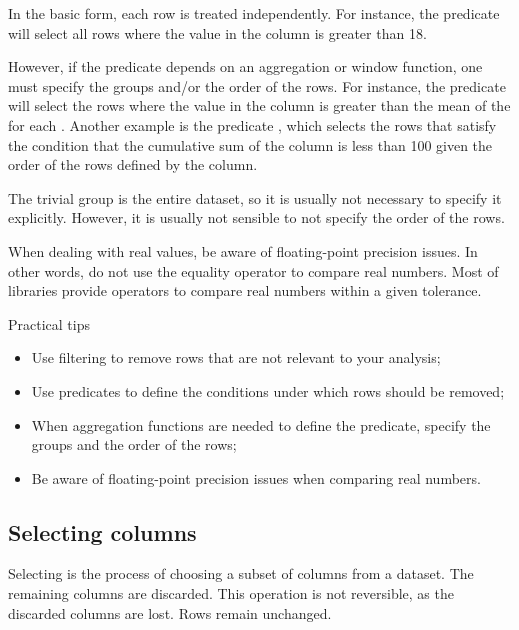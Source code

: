 In the basic form, each row is treated independently.  For instance, the predicate
 will select all rows where the value in the  column is
greater than 18.

However, if the predicate depends on an aggregation or window function, one must specify
the groups and/or the order of the rows.  For instance, the predicate  will select the rows where the value in the 
column is greater than the mean of the  for each . Another
example is the predicate , which selects the rows
that satisfy the condition that the cumulative sum of the  column is less
than 100 given the order of the rows defined by the  column.

The trivial group is the entire dataset, so it is usually not necessary to specify it
explicitly.  However, it is usually not sensible to not specify the order of the rows.

When dealing with real values, be aware of floating-point precision issues.  In other
words, do not use the equality operator to compare real numbers.  Most of libraries
provide operators to compare real numbers within a given tolerance.

\begin{hlbox}{Practical tips}
  \begin{itemize}
    \item Use filtering to remove rows that are not relevant to your analysis;
    \item Use predicates to define the conditions under which rows should be removed;
    \item When aggregation functions are needed to define the predicate, specify the groups and
      the order of the rows;
    \item Be aware of floating-point precision issues when comparing real numbers.
  \end{itemize}
\end{hlbox}

\subsection{Selecting columns}
\label{sub:selection}

Selecting is the process of choosing a subset of columns from a dataset.  The remaining
columns are discarded.  This operation is not reversible, as the discarded columns are
lost.  Rows remain unchanged.

